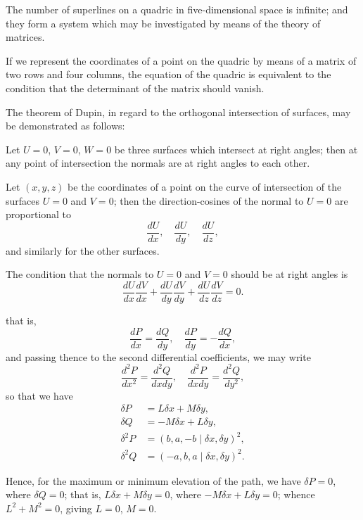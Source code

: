 \documentclass[11pt,a4paper]{book}
\begin{document}
The number of superlines on a quadric in five-dimensional space is infinite; and they form a system which may be investigated by means of the theory of matrices.

If we represent the coordinates of a point on the quadric by means of a matrix of two rows and four columns, the equation of the quadric is equivalent to the condition that the determinant of the matrix should vanish.

\newpage


The theorem of Dupin, in regard to the orthogonal intersection of surfaces, may be demonstrated as follows:

Let $U = 0$, $V = 0$, $W = 0$ be three surfaces which intersect at right angles; then at any point of intersection the normals are at right angles to each other.

Let $(x, y, z)$ be the coordinates of a point on the curve of intersection of the surfaces $U = 0$ and $V = 0$; then the direction-cosines of the normal to $U = 0$ are proportional to
\[
\frac{dU}{dx}, \quad \frac{dU}{dy}, \quad \frac{dU}{dz},
\]
and similarly for the other surfaces.

The condition that the normals to $U = 0$ and $V = 0$ should be at right angles is
\[
\frac{dU}{dx}\frac{dV}{dx} + \frac{dU}{dy}\frac{dV}{dy} + \frac{dU}{dz}\frac{dV}{dz} = 0.
\]

\newpage

that is,
\[
\frac{dP}{dx} = \frac{dQ}{dy}, \quad \frac{dP}{dy} = -\frac{dQ}{dx},
\]
and passing thence to the second differential coefficients, we may write
\[
\frac{d^2P}{dx^2} = \frac{d^2Q}{dxdy}, \quad \frac{d^2P}{dxdy} = \frac{d^2Q}{dy^2},
\]
so that we have
\begin{align*}
\delta P &= L\delta x + M\delta y, \\
\delta Q &= -M\delta x + L\delta y, \\
\delta^2 P &= (b, a, -b \mid \delta x, \delta y)^2, \\
\delta^2 Q &= (-a, b, a \mid \delta x, \delta y)^2.
\end{align*}

Hence, for the maximum or minimum elevation of the path, we have $\delta P = 0$, where $\delta Q = 0$; that is, $L\delta x + M\delta y = 0$, where $-M\delta x + L\delta y = 0$; whence $L^2 + M^2 = 0$, giving $L = 0$, $M = 0$.
\end{document}
